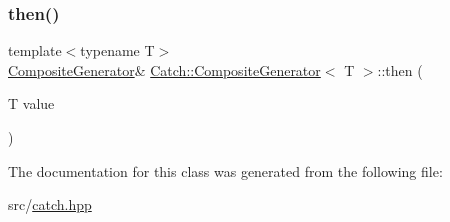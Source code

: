 \subsubsection{\texorpdfstring{then()}{then()}\hspace{0.1cm}{\footnotesize\ttfamily [2/2]}}
{\footnotesize\ttfamily template$<$typename T$>$ \\
\hyperlink{class_catch_1_1_composite_generator}{Composite\+Generator}\& \hyperlink{class_catch_1_1_composite_generator}{Catch\+::\+Composite\+Generator}$<$ T $>$\+::then (\begin{DoxyParamCaption}\item[{T}]{value }\end{DoxyParamCaption})\hspace{0.3cm}{\ttfamily [inline]}}



The documentation for this class was generated from the following file\+:\begin{DoxyCompactItemize}
\item 
src/\hyperlink{catch_8hpp}{catch.\+hpp}\end{DoxyCompactItemize}
